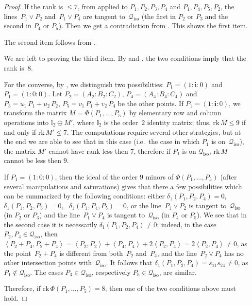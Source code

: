 \documentclass{amsart}
\theoremstyle{plain}
\theoremstyle{definition}
\newcommand{\iso}{\mathcal{Q}_{\mathrm{iso}}}
\newcommand{\scl}[2]{\left\langle {#1}, {#2} \right\rangle}
\newcommand{\iii}{\textbf{i}}
\newcommand{\rk}{\ensuremath{\mathrm{rk}}}
\begin{document}
\begin{proof}
If the rank is $\leq 7$, from
 applied to $P_1, P_2, P_3, P_4$ and $P_1, P_4, P_5, P_2$,
the lines~$P_1 \vee P_2$ and~$P_1 \vee P_4$ are tangent to~$\iso$ (the first in $P_2$ or $P_3$ and the second in $P_4$ or $P_5$).
Then we get a contradiction from .
This shows the first item.

The second item follows from .

We are left to proving the third item. By  and , the two conditions imply that the rank is~$8$.

For the converse, by , we distinguish two possibilities:
$P_1 = (1:\iii :0)$ and
$P_1 = (1: 0: 0)$.
Let $P_2 = (A_2: B_2: C_2)$, $P_4 = (A_4: B_4: C_4)$ and
$P_3 = u_1 \, P_1 + u_2 \, P_2$, $P_5 = v_1 \, P_1 + v_2 \, P_4$ be the other points.
If $P_1 = (1: \iii: 0)$, we transform the matrix $M = \Phi(P_1, \dots, P_5)$ by elementary row and column operations into $\mathbb{I}_2 \oplus M'$, where $\mathbb{I}_2$ is the order~$2$ identity matrix; thus, $\rk \, M \leq 9$ if and only if $\rk \, M' \leq 7$.
The computations require several other strategies, but at the end we are
able to see that in this case (i.e.\ the case in which $P_1$ is on~$\iso$), the matrix $M'$ cannot have rank less then $7$, therefore if $P_1$ is on 
$\iso$, $\rk\, M$ cannot be less then $9$.

If $P_1 = (1: 0: 0)$, then the ideal of the order $9$ minors of
$\Phi(P_1, \dots, P_5)$ (after several manipulations and saturations)
gives that there a few possibilities which can be summarized by the
following conditions: either $\delta_1(P_1, P_2, P_4) = 0$,
\ $\overline{\delta}_1(P_1, P_2, P_3) = 0$,
\ $\overline{\delta}_1(P_1, P_4, P_5) = 0$, or the line~$P_1 \vee P_2$ is tangent to~$\iso$ (in $P_2$ or $P_3$) and the line~$P_1 \vee P_4$ is tangent to~$\iso$ (in $P_4$ or $P_5$). We see that in the second case it is necessarily $\delta_1(P_1,P_2,P_4)
\neq 0$; indeed, in the case $P_2, P_4 \in \iso$, then $\scl{P_2 +P_4}{P_2+P_4}= \scl{P_2}{P_2} + \scl{P_4}{P_4}+2\scl{P_2}{P_4} =2\scl{P_2}{P_4} \neq 0$, as
the point~$P_2 + P_4$ is different from both~$P_2$ and~$P_4$, and the line~$P_2 \vee P_4$ has no other intersection points with~$\iso$. It follows that
$\delta_1 (P_1,P_2,P_4)=s_{11}s_{24} \neq 0$, as $P_1 \not\in \iso$. The cases $P_3 \in \iso$, respectively $P_5\in \iso$, are similar.

Therefore, if $\rk \, \Phi(P_1, \dots, P_5) = 8$, then one of the two conditions above must hold.
\end{proof}
\end{document}
